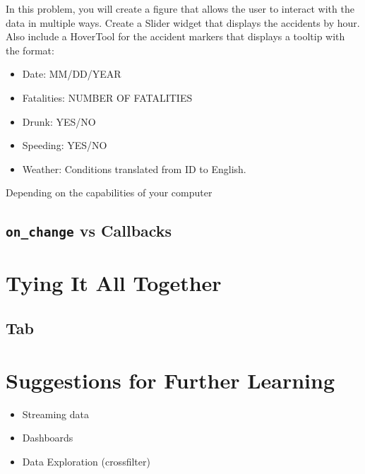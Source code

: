 \begin{problem}
In this problem, you will create a figure that allows the user to interact with
the data in multiple ways. Create a Slider widget that displays the accidents by
hour. Also include a HoverTool for the accident markers that displays a tooltip
with the format:
\begin{itemize}
    \item Date: MM/DD/YEAR
    \item Fatalities: NUMBER OF FATALITIES
    \item Drunk: YES/NO
    \item Speeding: YES/NO
    \item Weather: Conditions translated from ID to English.
\end{itemize}

\begin{info}
Depending on the capabilities of your computer
\end{info}

\end{problem}

\subsection*{\texttt{on\_change} vs Callbacks}

\section*{Tying It All Together}

\subsection*{Tab}

\section*{Suggestions for Further Learning}

\begin{itemize}
    \item Streaming data
    \item Dashboards
    \item Data Exploration (crossfilter)
\end{itemize}
